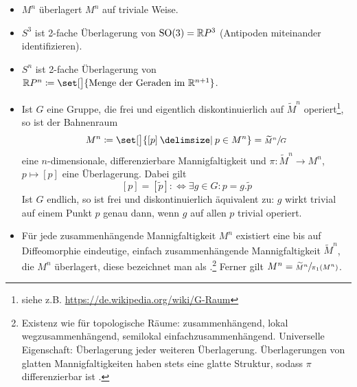 \begin{beispiel*}[{name=[Überlagerungen]}]
	\leavevmode
	\begin{itemize}[itemsep=2pt]
	    \item $M^n$ überlagert $M^n$ auf triviale Weise.
	    \item $S^3$ ist 2-fache Überlagerung von $\operatorname{SO}(3) = \mathbb{R}P^3$ (Antipoden miteinander identifizieren).
	    \item $S^n$ ist 2-fache Überlagerung von $\mathbb{R}P^n \coloneqq \set[\big]{\text{Menge der Geraden im }\mathbb{R}^{n+1}}$.
	    \item Ist $G$ eine Gruppe, die frei und eigentlich diskontinuierlich auf $\widetilde{M}^n$ operiert\footnote{siehe z.B. \url{https://de.wikipedia.org/wiki/G-Raum}}, so ist der Bahnenraum
	    \[
	        M^n \coloneqq \set[\big]{[p] \given p \in M^n} = \sfrac{\widetilde{M}^n}{G}
	    \]
	    eine $n$-dimensionale, differenzierbare Mannigfaltigkeit und $\pi \colon \widetilde{M}^n \to M^n$, $p \mapsto [p]$ eine Überlagerung.
		Dabei gilt
	    \[
	        [p] = [\tilde{p}] :\Longleftrightarrow \exists g \in G : p = g . \tilde{p}
	    \]
	    Ist $G$ endlich, so ist frei und diskontinuierlich äquivalent zu: $g$ wirkt trivial auf einem Punkt $p$ genau dann, wenn $g$ auf allen $p$ trivial operiert.
	    \item Für jede zusammenhängende Mannigfaltigkeit $M^n$ existiert eine bis auf Diffeomorphie eindeutige, einfach zusammenhängende Mannigfaltigkeit $\widetilde{M}^n$, die $M^n$ überlagert, diese bezeichnet man als .\footnote{Existenz wie für topologische Räume: zusammenhängend, lokal wegzusammenhängend, semilokal einfachzusammenhängend. Universelle Eigenschaft: Überlagerung jeder weiteren Überlagerung. Überlagerungen von glatten Mannigfaltigkeiten haben stets eine glatte Struktur, sodass $\pi$ differenzierbar ist \cite[Prop.~2.12]{LeeSmooth}.}
	    Ferner gilt $M^n = \sfrac{\widetilde{M}^n}{\pi_1(M^n)}$.
	\end{itemize}
\end{beispiel*}


